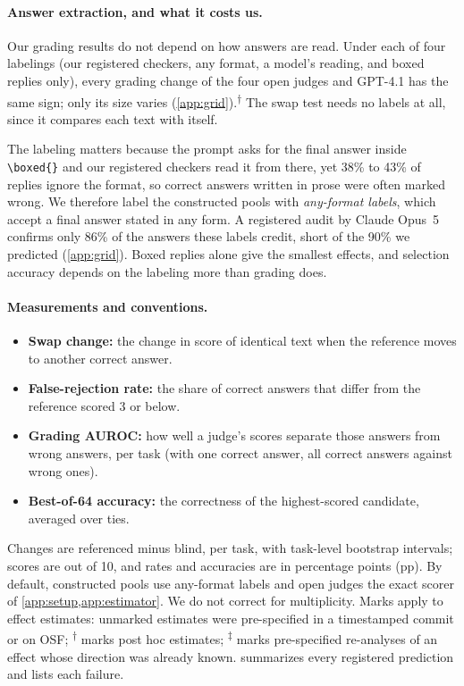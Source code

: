 \documentclass{article}
\newcommand{\reana}{\textsuperscript{$\ddagger$}}
\newcommand{\ph}{\textsuperscript{$\dagger$}}
\begin{document}
\paragraph{Answer extraction, and what it costs us.}
Our grading results do not depend on how answers are read. Under each of four labelings (our registered checkers, any format, a model's reading, and boxed replies only), every grading change of the four open judges and GPT-4.1 has the same sign; only its size varies (\cref{app:grid}).\ph{} The swap test needs no labels at all, since it compares each text with itself.

The labeling matters because the prompt asks for the final answer inside \texttt{\textbackslash boxed\{\}} and our registered checkers read it from there, yet 38\% to 43\% of replies ignore the format, so correct answers written in prose were often marked wrong.
We therefore label the constructed pools with \emph{any-format labels}, which accept a final answer stated in any form.
A registered audit by Claude Opus~5 confirms only 86\% of the answers these labels credit, short of the 90\% we predicted (\cref{app:grid}).
Boxed replies alone give the smallest effects, and selection accuracy depends on the labeling more than grading does.

\paragraph{Measurements and conventions.}
\begin{itemize}[leftmargin=1.2em,itemsep=1pt,topsep=2pt]
\item \textbf{Swap change:} the change in score of identical text when the reference moves to another correct answer.
\item \textbf{False-rejection rate:} the share of correct answers that differ from the reference scored 3 or below.
\item \textbf{Grading AUROC:} how well a judge's scores separate those answers from wrong answers, per task (with one correct answer, all correct answers against wrong ones).
\item \textbf{Best-of-64 accuracy:} the correctness of the highest-scored candidate, averaged over ties.
\end{itemize}
Changes are referenced minus blind, per task, with task-level bootstrap intervals; scores are out of 10, and rates and accuracies are in percentage points (pp). By default, constructed pools use any-format labels and open judges the exact scorer of \cref{app:setup,app:estimator}. We do not correct for multiplicity.
Marks apply to effect estimates: unmarked estimates were pre-specified in a timestamped commit or on OSF; \ph{} marks post hoc estimates; \reana{} marks pre-specified re-analyses of an effect whose direction was already known.  summarizes every registered prediction and lists each failure.
\end{document}
